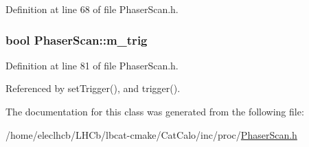 Definition at line 68 of file PhaserScan.h.\hypertarget{classPhaserScan_ab3fd16cfcce13a09f5c1e91d96de60e6}{
\subsubsection[{m\_\-trig}]{\setlength{\rightskip}{0pt plus 5cm}bool {\bf PhaserScan::m\_\-trig}}}
\label{classPhaserScan_ab3fd16cfcce13a09f5c1e91d96de60e6}


Definition at line 81 of file PhaserScan.h.

Referenced by setTrigger(), and trigger().

The documentation for this class was generated from the following file:\begin{DoxyCompactItemize}
\item 
/home/eleclhcb/LHCb/lbcat-\/cmake/CatCalo/inc/proc/\hyperlink{PhaserScan_8h}{PhaserScan.h}\end{DoxyCompactItemize}
